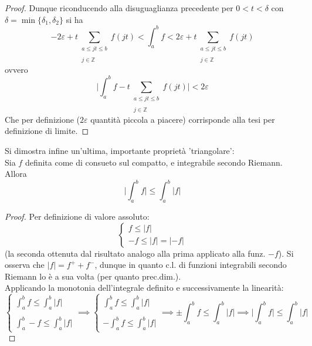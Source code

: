 \documentclass[10pt, oneside]{book}
\theoremstyle{plain}
\begin{document}
\begin{proof}
    Dunque riconducendo alla disuguaglianza precedente per $0 < t < \delta$ con $\delta = \min\{\delta_1, \delta_2\}$ si ha
    \[- 2 \varepsilon + t \sum_{\substack{a \leq jt \leq b \\~\\ j \in \mathbb{Z}}} f(jt) < \int_a^b f < 2 \varepsilon + t \sum_{\substack{a \leq jt \leq b \\~\\ j \in \mathbb{Z}}} f(jt)\]
    ovvero
    \[\big| \int_a^b f -   t \sum_{\substack{a \leq jt \leq b \\~\\ j \in \mathbb{Z}}} f(jt) \big| < 2\varepsilon\]
    Che per definizione ($2\varepsilon$ quantità piccola a piacere) corrisponde alla tesi per definizione di limite.
\end{proof}

Si dimostra infine un'ultima, importante proprietà 'triangolare':
\\Sia $f$ definita come di consueto sul compatto, e integrabile secondo Riemann. Allora
\[\boxed{\big|\int_a^b f\big| \leq \int_a^b |f|}\]
\begin{proof}
    Per definizione di valore assoluto:
    \[\begin{cases}
        f \leq |f| \\
        -f \leq |f| = |-f|        
    \end{cases}\]
    (la seconda ottenuta dal risultato analogo alla prima applicato alla funz. $-f$). Si osserva che $|f| = f^+ + f^-$, dunque in quanto c.l. di funzioni integrabili secondo Riemann lo è a sua volta (per quanto prec.dim.).
    \\Applicando la monotonia dell'integrale definito e successivamente la linearità:
    \[\begin{cases}
        \displaystyle \int_a^b f \leq \int_a^b |f| \\ \\
        \displaystyle \int_a^b -f \leq \int_a^b |f|       
    \end{cases} \implies \begin{cases}
        \displaystyle \int_a^b f \leq \int_a^b |f| \\ \\
        \displaystyle - \int_a^b f \leq \int_a^b |f|       
    \end{cases} \implies \pm  \int_a^b f \leq \int_a^b |f| \implies \big|\int_a^b f\big| \leq \int_a^b |f|\]
\end{proof}
\end{document}
